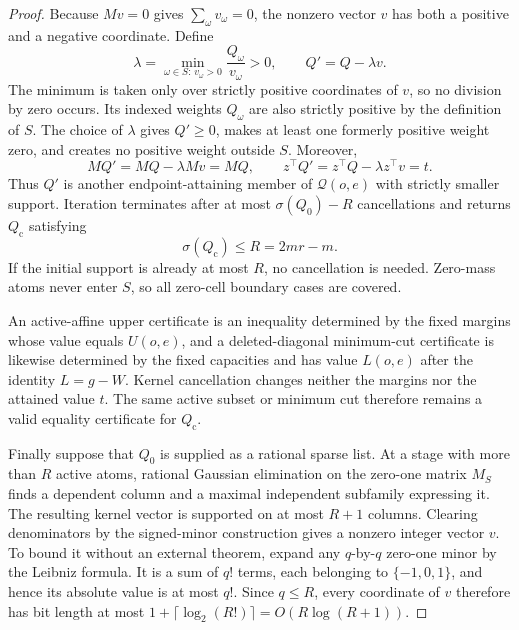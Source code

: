 \documentclass{article}
\begin{document}
\begin{proof}
Because \(Mv=0\) gives \(\sum_\omega v_\omega=0\), the nonzero vector \(v\) has both a positive and a negative coordinate.  Define
\[
 \lambda=\min_{\omega\in S:\,v_\omega>0}\frac{Q_\omega}{v_\omega}>0,
 \qquad Q'=Q-\lambda v.
\]
The minimum is taken only over strictly positive coordinates of \(v\), so no division by zero occurs.  Its indexed weights \(Q_\omega\) are also strictly positive by the definition of \(S\).  The choice of \(\lambda\) gives \(Q'\geq0\), makes at least one formerly positive weight zero, and creates no positive weight outside \(S\).  Moreover,
\[
 MQ'=MQ-\lambda Mv=MQ,
 \qquad
 z^\top Q'=z^\top Q-\lambda z^\top v=t.
\]
Thus \(Q'\) is another endpoint-attaining member of \(\mathcal Q(o,e)\) with strictly smaller support.  Iteration terminates after at most \(\sigma(Q_0)-R\) cancellations and returns \(Q_{\mathrm c}\) satisfying
\[
 \sigma(Q_{\mathrm c})\leq R=2mr-m.
\]
If the initial support is already at most \(R\), no cancellation is needed.  Zero-mass atoms never enter \(S\), so all zero-cell boundary cases are covered.

An active-affine upper certificate is an inequality determined by the fixed margins whose value equals \(U(o,e)\), and a deleted-diagonal minimum-cut certificate is likewise determined by the fixed capacities and has value \(L(o,e)\) after the identity \(L=g-W\).  Kernel cancellation changes neither the margins nor the attained value \(t\).  The same active subset or minimum cut therefore remains a valid equality certificate for \(Q_{\mathrm c}\).

Finally suppose that \(Q_0\) is supplied as a rational sparse list.  At a stage with more than \(R\) active atoms, rational Gaussian elimination on the zero-one matrix \(M_S\) finds a dependent column and a maximal independent subfamily expressing it.  The resulting kernel vector is supported on at most \(R+1\) columns.  Clearing denominators by the signed-minor construction gives a nonzero integer vector \(v\).  To bound it without an external theorem, expand any \(q\)-by-\(q\) zero-one minor by the Leibniz formula.  It is a sum of \(q!\) terms, each belonging to \(\{-1,0,1\}\), and hence its absolute value is at most \(q!\).  Since \(q\leq R\), every coordinate of \(v\) therefore has bit length at most \(1+\lceil\log_2(R!)\rceil=O(R\log(R+1))\).


\end{proof}
\end{document}
